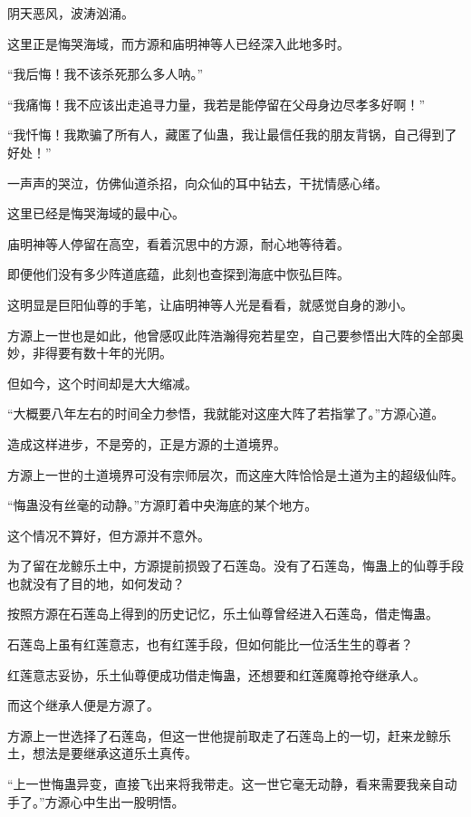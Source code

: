 
\begin{this_body}

阴天恶风，波涛汹涌。

这里正是悔哭海域，而方源和庙明神等人已经深入此地多时。

“我后悔！我不该杀死那么多人呐。”

“我痛悔！我不应该出走追寻力量，我若是能停留在父母身边尽孝多好啊！”

“我忏悔！我欺骗了所有人，藏匿了仙蛊，我让最信任我的朋友背锅，自己得到了好处！”

一声声的哭泣，仿佛仙道杀招，向众仙的耳中钻去，干扰情感心绪。

这里已经是悔哭海域的最中心。

庙明神等人停留在高空，看着沉思中的方源，耐心地等待着。

即便他们没有多少阵道底蕴，此刻也查探到海底中恢弘巨阵。

这明显是巨阳仙尊的手笔，让庙明神等人光是看看，就感觉自身的渺小。

方源上一世也是如此，他曾感叹此阵浩瀚得宛若星空，自己要参悟出大阵的全部奥妙，非得要有数十年的光阴。

但如今，这个时间却是大大缩减。

“大概要八年左右的时间全力参悟，我就能对这座大阵了若指掌了。”方源心道。

造成这样进步，不是旁的，正是方源的土道境界。

方源上一世的土道境界可没有宗师层次，而这座大阵恰恰是土道为主的超级仙阵。

“悔蛊没有丝毫的动静。”方源盯着中央海底的某个地方。

这个情况不算好，但方源并不意外。

为了留在龙鲸乐土中，方源提前损毁了石莲岛。没有了石莲岛，悔蛊上的仙尊手段也就没有了目的地，如何发动？

按照方源在石莲岛上得到的历史记忆，乐土仙尊曾经进入石莲岛，借走悔蛊。

石莲岛上虽有红莲意志，也有红莲手段，但如何能比一位活生生的尊者？

红莲意志妥协，乐土仙尊便成功借走悔蛊，还想要和红莲魔尊抢夺继承人。

而这个继承人便是方源了。

方源上一世选择了石莲岛，但这一世他提前取走了石莲岛上的一切，赶来龙鲸乐土，想法是要继承这道乐土真传。

“上一世悔蛊异变，直接飞出来将我带走。这一世它毫无动静，看来需要我亲自动手了。”方源心中生出一股明悟。


\end{this_body}

